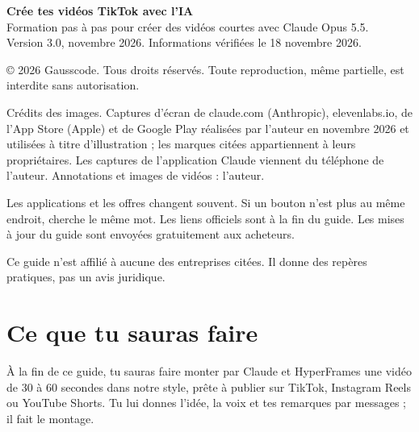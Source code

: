 \documentclass[11pt,oneside,openany]{book}
\begin{document}
\thispagestyle{empty}
\vspace*{2cm}
{\footnotesize\color{gris}
\textbf{\color{encre}Crée tes vidéos TikTok avec l'IA}\\
Formation pas à pas pour créer des vidéos courtes avec Claude Opus 5.5.\\
Version 3.0, novembre 2026. Informations vérifiées le 18 novembre 2026.

© 2026 Gausscode. Tous droits réservés. Toute reproduction, même partielle, est interdite sans autorisation.

Crédits des images. Captures d'écran de claude.com (Anthropic), elevenlabs.io, de l'App Store (Apple) et de Google Play réalisées par l'auteur en novembre 2026 et utilisées à titre d'illustration ; les marques citées appartiennent à leurs propriétaires. Les captures de l'application Claude viennent du téléphone de l'auteur. Annotations et images de vidéos : l'auteur.

Les applications et les offres changent souvent. Si un bouton n'est plus au même endroit, cherche le même mot. Les liens officiels sont à la fin du guide. Les mises à jour du guide sont envoyées gratuitement aux acheteurs.

Ce guide n'est affilié à aucune des entreprises citées. Il donne des repères pratiques, pas un avis juridique.}

\clearpage
\begingroup\setlength{\parskip}{0pt}\titlespacing*{\chapter}{0pt}{-0.6cm}{0.4em}\tableofcontents\endgroup

\chapter*{Ce que tu sauras faire}

À la fin de ce guide, tu sauras faire monter par Claude et HyperFrames une vidéo de 30 à 60 secondes dans notre style, prête à publier sur TikTok, Instagram Reels ou YouTube Shorts. Tu lui donnes l'idée, la voix et tes remarques par messages ; il fait le montage.
\end{document}
